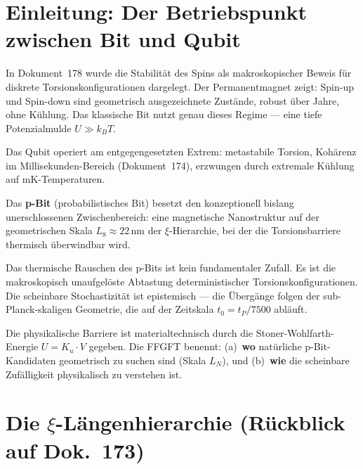 	\maketitle
	\tableofcontents
	\newpage
	
	\section{Einleitung: Der Betriebspunkt zwischen Bit und Qubit}
	\label{sec:einleitung}
	
	In Dokument~178 wurde die Stabilität des Spins als makroskopischer Beweis
	für diskrete Torsionskonfigurationen dargelegt. Der Permanentmagnet zeigt:
	Spin-up und Spin-down sind geometrisch ausgezeichnete Zustände, robust über
	Jahre, ohne Kühlung. Das klassische Bit nutzt genau dieses Regime ---
	eine tiefe Potenzialmulde $U \gg k_B T$.
	
	Das Qubit operiert am entgegengesetzten Extrem: metastabile Torsion,
	Kohärenz im Millisekunden-Bereich (Dokument~174), erzwungen durch
	extremale Kühlung auf mK-Temperaturen.
	
	Das \textbf{p-Bit} (probabilistisches Bit) besetzt den konzeptionell
	bislang unerschlossenen Zwischenbereich: eine magnetische Nanostruktur
	auf der geometrischen Skala $L_8 \approx 22\,\text{nm}$ der
	$\xi$-Hierarchie, bei der die Torsionsbarriere thermisch überwindbar wird.
	
	\begin{significance}
		Das thermische Rauschen des p-Bits ist kein fundamentaler Zufall.
		Es ist die makroskopisch unaufgelöste Abtastung deterministischer
		Torsionskonfigurationen. Die scheinbare Stochastizität ist epistemisch
		--- die Übergänge folgen der sub-Planck-skaligen Geometrie,
		die auf der Zeitskala $t_0 = t_P/7500$ abläuft.
		
		Die physikalische Barriere ist materialtechnisch durch die
		Stoner-Wohlfarth-Energie $U = K_u \cdot V$ gegeben.
		Die FFGFT benennt: (a)~\textbf{wo} natürliche p-Bit-Kandidaten
		geometrisch zu suchen sind (Skala $L_N$), und (b)~\textbf{wie} die
		scheinbare Zufälligkeit physikalisch zu verstehen ist.
	\end{significance}
	
	\section{Die \texorpdfstring{$\xi$}{xi}-Längenhierarchie
		(Rückblick auf Dok.~173)}
	\label{sec:laengenhierarchie}
	
